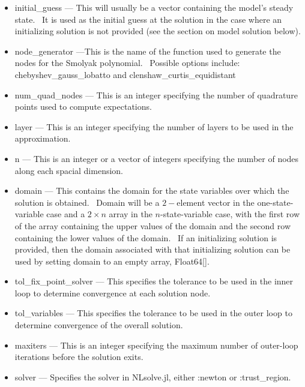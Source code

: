 \documentclass[notitlepage,11pt]{article}
\begin{document}
\begin{itemize}
\item initial\_guess --- This will usually be a vector containing the
model's steady state. \ It is used as the initial guess at the solution in
the case where an initializing solution is not provided (see the section on
model solution below).

\item node\_generator ---This is the name of the function used to generate
the nodes for the Smolyak polynomial. \ Possible options include:
chebyshev\_gauss\_lobatto and clenshaw\_curtis\_equidistant

\item num\_quad\_nodes --- This is an integer specifying the number of
quadrature points used to compute expectations.

\item layer --- This is an integer specifying the number of layers to be
used in the approximation.

\item n --- This is an integer or a vector of integers specifying the number
of nodes along each spacial dimension.

\item domain --- This contains the domain for the state variables over which
the solution is obtained. \ Domain will be a $2-$element vector in the
one-state-variable case and a $2\times n$ array in the $n$-state-variable
case, with the first row of the array containing the upper values of the
domain and the second row containing the lower values of the domain. \ If an
initializing solution is provided, then the domain associated with that
initializing solution can be used by setting domain to an empty array,
Float64[].

\item tol\_fix\_point\_solver --- This specifies the tolerance to be used in
the inner loop to determine convergence at each solution node.

\item tol\_variables --- This specifies the tolerance to be used in the
outer loop to determine convergence of the overall solution.

\item maxiters --- This is an integer specifying the maximum number of
outer-loop iterations before the solution exits.

\item solver --- Specifies the solver in NLsolve.jl, either :newton or
:trust\_region.
\end{itemize}
\end{document}
